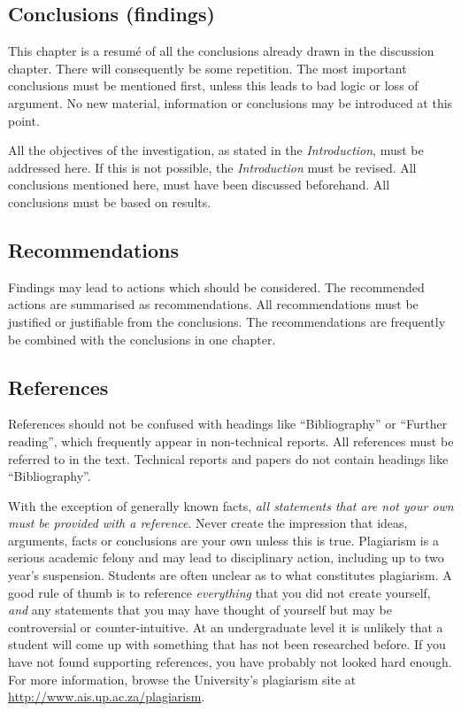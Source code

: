 \documentclass[a5paper, 10pt]{article}
\newcommand{\subsectionname}[1]{\emph{#1}}
\begin{document}
\subsection{Conclusions (findings)}
\label{sec:conclusions}
This chapter is a resum\'e of all the conclusions already drawn in the
discussion chapter.  There will consequently be some repetition.  The
most important conclusions must be mentioned first, unless this leads
to bad logic or loss of argument.  No new material, information or
conclusions may be introduced at this point.

All the objectives of the investigation, as stated in the
\subsectionname{Introduction}, must be addressed here.  
If this is not possible, the \subsectionname{Introduction} must be revised.
All conclusions mentioned here, must have been discussed beforehand.  
All conclusions must be based on results.

\subsection{Recommendations}
\label{sec:recommendations}

Findings may lead to actions which should be considered.  The
recommended actions are summarised as recommendations.  All
recommendations must be justified or justifiable from the conclusions.
The recommendations are frequently be combined with the conclusions in one chapter.

\subsection{References}
\label{sec:references}
References should not be confused with headings like ``Bibliography''
or ``Further reading'', which frequently appear in non-technical
reports.  All references must be referred to in the text. Technical
reports and papers do not contain headings like ``Bibliography''.

With the exception of generally known facts, \emph{all statements that are
not your own must be provided with a reference}.  Never create the
impression that ideas, arguments, facts or conclusions are your own
unless this is true.  Plagiarism is a serious academic felony and may lead to disciplinary action, including up to two year's suspension.
Students are often unclear as to what constitutes plagiarism.  A good
rule of thumb is to reference \emph{everything} that you did not
create yourself, \emph{and} any statements that you may have thought
of yourself but may be controversial or counter-intuitive.  At an
undergraduate level it is unlikely that a student will come up with
something that has not been researched before.  If you have not found
supporting references, you have probably not looked hard enough.  For
more information, browse the University's plagiarism site at
\url{http://www.ais.up.ac.za/plagiarism}.
\end{document}

